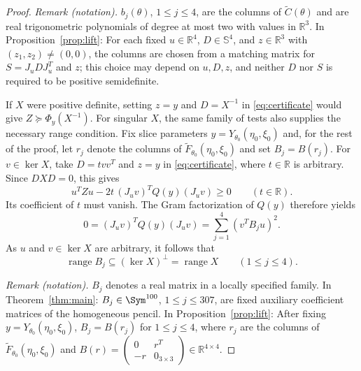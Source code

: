 \begin{proof}
\noindent\textit{Remark (notation).} $b_j(\theta)$, $1\leq j\leq4$, are the columns of $\widetilde C(\theta)$ and are real trigonometric polynomials of degree at most two with values in $\mathbb R^3$. In Proposition~\ref{prop:lift}: For each fixed $u\in\mathbb R^4$, $D\in\mathbb S^4$, and $z\in\mathbb R^3$ with $(z_1,z_2)\neq(0,0)$, the columns are chosen from a matching matrix for $S=J_uDJ_u^T$ and $z$; this choice may depend on $u,D,z$, and neither $D$ nor $S$ is required to be positive semidefinite.


If $X$ were positive definite, setting $z=y$ and $D=X^{-1}$ in
\eqref{eq:certificate} would give $Z\succeq\Phi_y(X^{-1})$.
For singular $X$, the same family of tests also supplies the necessary
range condition.  Fix slice parameters
$y=Y_{\theta_0}(\eta_0,\xi_0)$ and, for the rest of the proof, let
$r_j$ denote the columns of
$\widetilde F_{\theta_0}(\eta_0,\xi_0)$ and set $B_j=B(r_j)$.
For $v\in\ker X$, take $D=t vv^T$ and $z=y$ in
\eqref{eq:certificate}, where $t\in\mathbb R$ is arbitrary.  Since
$DXD=0$, this gives
\[
  u^TZu-2t\,(J_uv)^TQ(y)(J_uv)\geq0
  \qquad(t\in\mathbb R).
\]
Its coefficient of $t$ must vanish.  The Gram factorization of $Q(y)$
therefore yields
\[
  0=(J_uv)^TQ(y)(J_uv)
    =\sum_{j=1}^4(v^TB_ju)^2.
\]
As $u$ and $v\in\ker X$ are arbitrary, it follows that
\begin{equation}\label{eq:range}
  \operatorname{range}B_j\subseteq(\ker X)^\perp
    =\operatorname{range}X\qquad(1\leq j\leq4).
\end{equation}

\noindent\textit{Remark (notation).} $B_j$ denotes a real matrix in a locally specified family. In Theorem~\ref{thm:main}: $B_j\in\Sym^{100}$, $1\leq j\leq307$, are fixed auxiliary coefficient matrices of the homogeneous pencil. In Proposition~\ref{prop:lift}: After fixing $y=Y_{\theta_0}(\eta_0,\xi_0)$, $B_j=B(r_j)$ for $1\leq j\leq4$, where $r_j$ are the columns of $\widetilde F_{\theta_0}(\eta_0,\xi_0)$ and $B(r)=\begin{pmatrix}0&r^T\\-r&0_{3\times3}\end{pmatrix}\in\mathbb R^{4\times4}$.



\end{proof}
